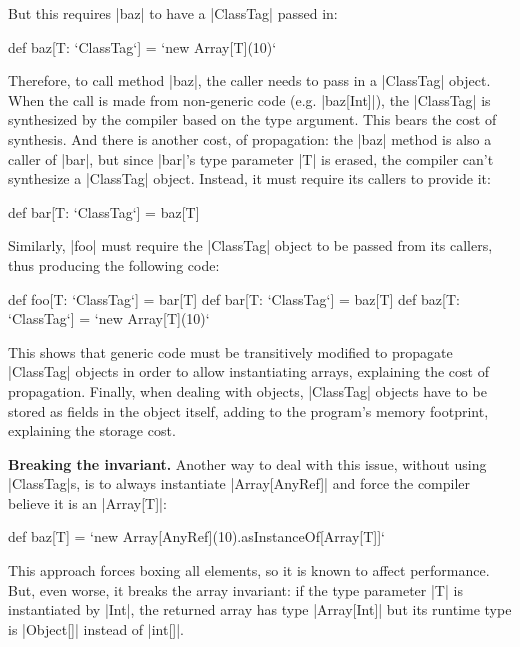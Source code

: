 But this requires |baz| to have a |ClassTag| passed in:

\begin{lstlisting-nobreak}
 def baz[T: `ClassTag`] = `new Array[T](10)`
\end{lstlisting-nobreak}

Therefore, to call method |baz|, the caller needs to pass in a |ClassTag| object. When the call is made from non-generic code (e.g. |baz[Int]|), the |ClassTag| is synthesized by the compiler based on the type argument. This bears the cost of synthesis. And there is another cost, of propagation: the |baz| method is also a caller of |bar|, but since |bar|'s  type parameter |T| is erased, the compiler can't synthesize a |ClassTag| object. Instead, it must require its callers to provide it:

\begin{lstlisting-nobreak}
 def bar[T: `ClassTag`] = baz[T]
\end{lstlisting-nobreak}

Similarly, |foo| must require the |ClassTag| object to be passed from its callers, thus producing the following code:

\begin{lstlisting-nobreak}
 def foo[T: `ClassTag`] = bar[T]
 def bar[T: `ClassTag`] = baz[T]
 def baz[T: `ClassTag`] = `new Array[T](10)`
\end{lstlisting-nobreak}

This shows that generic code must be transitively modified to propagate |ClassTag| objects in order to allow instantiating arrays, explaining the cost of propagation. Finally, when dealing with objects, |ClassTag| objects have to be stored as fields in the object itself, adding to the program's memory footprint, explaining the storage cost.

\textbf{Breaking the invariant.} Another way to deal with this issue, without using |ClassTag|s, is to always instantiate |Array[AnyRef]| and force the compiler believe it is an |Array[T]|:

\begin{lstlisting-nobreak}
 def baz[T] = `new Array[AnyRef](10).asInstanceOf[Array[T]]`
\end{lstlisting-nobreak}

This approach forces boxing all elements, so it is known to affect performance. But, even worse, it breaks the array invariant: if the type parameter |T| is instantiated by |Int|, the returned array has type |Array[Int]| but its runtime type is |Object[]| instead of |int[]|.


